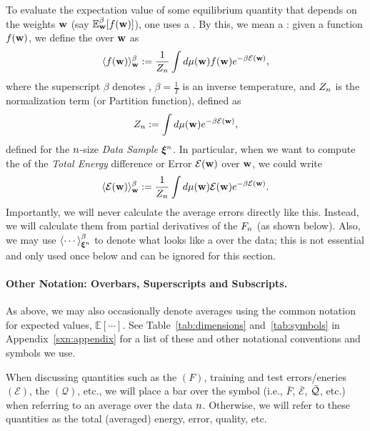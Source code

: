 To evaluate the expectation value of some equilibrium quantity that depends on the weights ${\mathbf{w}}$ (say $\mathbb{E}^{\beta}_{{\mathbf{w}}}[f({\mathbf{w}})]$), one uses a \ThermalAverage.
By this, we mean a \emph{\BoltzmannWeightedAverage}: given a function $f({\mathbf{w}})$,
we define the \ThermalAverage over ${\mathbf{w}}$ as
\begin{align}
\label{eqn:thrmavg}
\langle f({\mathbf{w}})\rangle_{{\mathbf{w}}}^{{\beta}}:=\dfrac{1}{Z_{n}}\int d\mu({\mathbf{w}}) f({\mathbf{w}})e^{-\beta \mathcal{E}(\mathbf{w})}  ,
\end{align}
where the superscript $\beta$ denotes \ThermalAverage,
$\beta=\frac{1}{T}$ is an inverse temperature, and 
$Z_{n}$ is the normalization term (or Partition function), defined as
\begin{align}
\label{eqn:Zwn}
Z_{n}:=\int d\mu({\mathbf{w}}) e^{-\beta \mathcal{E}(\mathbf{w})},
\end{align}
defined for the $n$-size \emph{Data Sample} $\boldsymbol{\xi}^{n}$.
%
In particular, when we want to compute the \ThermalAverage of the \emph{Total Energy} difference or Error
$\mathcal{E}(\mathbf{w})$ over ${\mathbf{w}}$, we could write
\begin{align}
\label{eqn:Detot}
\langle \mathcal{E}(\mathbf{w}) \rangle^{\beta}_{{\mathbf{w}}}:=\dfrac{1}{Z_{n}}\int d\mu({\mathbf{w}}) \mathcal{E}(\mathbf{w}) e^{-\beta \mathcal{E}(\mathbf{w})} .
\end{align}
Importantly, we will never calculate the average errors directly like this.
Instead, we will calculate them from partial derivatives of the \FreeEnergy $F_{n}$ (as shown below).
Also, we may use $\langle \cdots \rangle^{\beta}_{\boldsymbol{\xi}^{n}}$ to denote what looks like a \ThermalAverage over the data;
this is not essential and only used once below and can be ignored for this section.

\paragraph{Other Notation: Overbars, Superscripts and Subscripts.}
As above, we may also occasionally denote averages using the common notation for expected values, $\mathbb{E}[\cdots]$.
See Table~\ref{tab:dimensions} and~\ref{tab:symbols} in Appendix~\ref{sxn:appendix} for a list of these and other notational conventions and symbols we use.

When discussing quantities such as the \FreeEnergy $(F)$, 
training and test errors/eneries $(\mathcal{E})$, 
the \LayerQuality $(\mathcal{Q})$, etc.,
we will place a bar over the symbol (i.e., $\bar{F}$, $\bar{\mathcal{E}}$, $\bar{\mathcal{Q}}$, etc.) when referring to
an average over the data $n$.
Otherwise, we will refer to these quantities as the total (averaged) energy, error, quality, etc.

